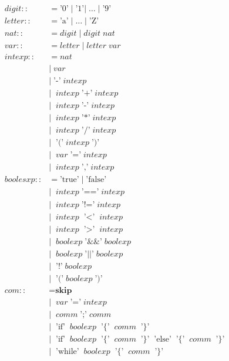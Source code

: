 \documentclass[11pt]{article}
\begin{document}
\begin{align*}
  digit ::&= \text{'0'} \; | \; \text{'1'} | \; \dotsc \; | \; \text{'9'} \\
  letter ::&= \text{'a'} \; | \; \dotsc \; | \; \text{'Z'} \\
  nat ::&= digit \; | \; digit \; nat \\
  var ::&= letter \; | \; letter \; var \\
  intexp ::&= nat \\
           &| \; var \\
           &| \; \text{'-'} \; intexp \\
           &| \;\; intexp \; \text{'+'}  \; intexp \\
           &| \;\; intexp \; \text{'-'}  \; intexp \\
           &| \;\; intexp \; \text{'*'}  \; intexp \\
           &| \;\; intexp \; \text{'/'}  \; intexp \\
           &| \;\; \text{'('} \; intexp \; \text{')'} \\
           &| \;\; var \; \text{'='} \; intexp \\
           &| \;\; intexp \; \text{','} \; intexp \\
boolesxp ::&= \text{'true'} \; | \; \text{'false'} \\
           &| \;\; intexp \; \text{'=='} \; intexp \\
           &| \;\; intexp \; \text{'!='}  \; intexp \\
           &| \;\; intexp \; \text{'$<$'}  \; intexp \\
           &| \;\; intexp \; \text{'$>$'}  \; intexp \\
           &| \;\; boolexp \; \text{'\&\&'}  \; boolexp \\
           &| \;\; boolexp \; \text{'$\vert\vert$'}  \; boolexp \\
           &| \;\; \text{'!'} \; boolexp \\
           &| \;\; \text{'('} \; boolexp \; \text{')'} \\
com ::&= \textbf{skip} \\
      &| \;\; var \; \text{'='} \; intexp \\
      &| \;\; comm \; \text{';'} \; comm \\
      &| \;\; \text{'if'} \;\;boolexp \;\; \text{'\{'} \;\; comm \;\; \text{'\}'} \\
      &| \;\; \text{'if'} \;\;boolexp \;\; \text{'\{'} \;\; comm \;\; \text{'\}'}  \;\; \text{'else'} \;\; \text{'\{'} \;\; comm \;\; \text{'\}'} \\
      &| \;\; \text{'while'} \;\;boolexp \;\; \text{'\{'} \;\; comm \;\; \text{'\}'} \\
\end{align*}

\end{document}
